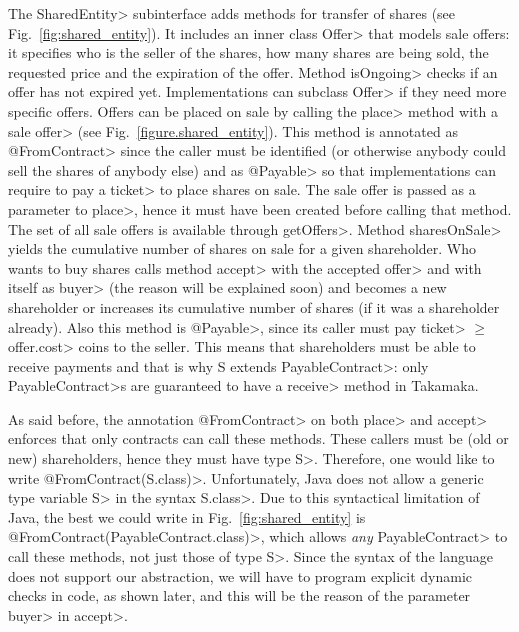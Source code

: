The \<SharedEntity> subinterface adds methods for transfer of shares
(see Fig.~\ref{fig:shared_entity}).
It includes an inner class \<Offer> that models sale offers:
it specifies who is the seller of the shares,
how many shares are being sold, the requested price and the expiration of the offer.
Method \<isOngoing> checks if an offer has not expired yet.
Implementations can subclass \<Offer> if they need more specific offers.
Offers can be placed on sale
by calling the \<place> method with a sale \<offer>
(see Fig.~\ref{figure.shared_entity}).
This method is annotated as \<@FromContract> since the caller must be
identified (or otherwise anybody could sell the shares of anybody else) and
as \<@Payable> so that implementations can require
to pay a \<ticket> to place shares on sale.
The sale offer is passed as a parameter to \<place>, hence it must have been created before calling that method.
The set of all sale offers is available through \<getOffers>. Method \<sharesOnSale> yields the
cumulative number of shares on sale for a given shareholder.
Who wants to buy shares calls method \<accept> with the accepted \<offer>
and with itself as \<buyer> (the reason will be explained soon)
and becomes a new shareholder or increases
its cumulative number of shares (if it was a shareholder already).
Also this method is \<@Payable>, since its caller must pay \<ticket> $\ge$ \<offer.cost>
coins to the seller.
This means that shareholders must be able to receive payments and that
is why \<S extends PayableContract>: only \<PayableContract>s are guaranteed to have a
\<receive> method in Takamaka.

As said before, the annotation \<@FromContract> on both \<place> and \<accept> enforces that only
contracts can call these methods.
These callers must be (old or new) shareholders,
hence they must have type \<S>. Therefore, one would like to write
\<@FromContract(S.class)>. Unfortunately, Java does not allow a generic type variable \<S>
in the syntax \<S.class>. Due to this syntactical limitation of Java,
the best we could write in Fig.~\ref{fig:shared_entity} is \<@FromContract(PayableContract.class)>,
which allows \emph{any} \<PayableContract> to call these methods, not just those of type \<S>.
Since the syntax of the language does not support our abstraction, we will have to
program explicit dynamic checks in code, as shown later, and this will be the reason of the
parameter \<buyer> in \<accept>.



